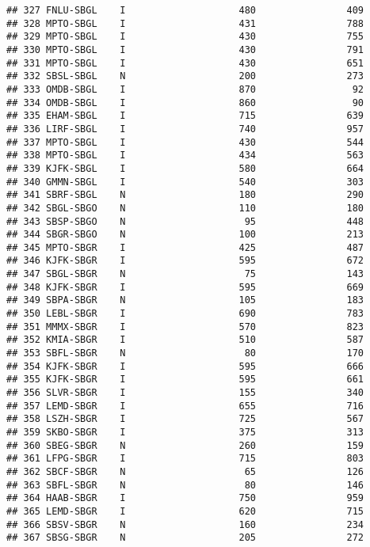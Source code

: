 \documentclass[
]{article}
\begin{document}
\begin{verbatim}
## 327 FNLU-SBGL    I                    480                409
## 328 MPTO-SBGL    I                    431                788
## 329 MPTO-SBGL    I                    430                755
## 330 MPTO-SBGL    I                    430                791
## 331 MPTO-SBGL    I                    430                651
## 332 SBSL-SBGL    N                    200                273
## 333 OMDB-SBGL    I                    870                 92
## 334 OMDB-SBGL    I                    860                 90
## 335 EHAM-SBGL    I                    715                639
## 336 LIRF-SBGL    I                    740                957
## 337 MPTO-SBGL    I                    430                544
## 338 MPTO-SBGL    I                    434                563
## 339 KJFK-SBGL    I                    580                664
## 340 GMMN-SBGL    I                    540                303
## 341 SBRF-SBGL    N                    180                290
## 342 SBGL-SBGO    N                    110                180
## 343 SBSP-SBGO    N                     95                448
## 344 SBGR-SBGO    N                    100                213
## 345 MPTO-SBGR    I                    425                487
## 346 KJFK-SBGR    I                    595                672
## 347 SBGL-SBGR    N                     75                143
## 348 KJFK-SBGR    I                    595                669
## 349 SBPA-SBGR    N                    105                183
## 350 LEBL-SBGR    I                    690                783
## 351 MMMX-SBGR    I                    570                823
## 352 KMIA-SBGR    I                    510                587
## 353 SBFL-SBGR    N                     80                170
## 354 KJFK-SBGR    I                    595                666
## 355 KJFK-SBGR    I                    595                661
## 356 SLVR-SBGR    I                    155                340
## 357 LEMD-SBGR    I                    655                716
## 358 LSZH-SBGR    I                    725                567
## 359 SKBO-SBGR    I                    375                313
## 360 SBEG-SBGR    N                    260                159
## 361 LFPG-SBGR    I                    715                803
## 362 SBCF-SBGR    N                     65                126
## 363 SBFL-SBGR    N                     80                146
## 364 HAAB-SBGR    I                    750                959
## 365 LEMD-SBGR    I                    620                715
## 366 SBSV-SBGR    N                    160                234
## 367 SBSG-SBGR    N                    205                272

\end{verbatim}
\end{document}

